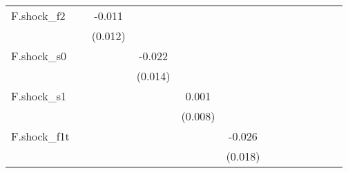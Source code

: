 {\begin{tabular}{l*{12}{c}}
\addlinespace
F.shock\_f2  &                     &      -0.011         &                     &                     &                     &                     &                     &                     &                     &                     &                     &                     \\
            &                     &     (0.012)         &                     &                     &                     &                     &                     &                     &                     &                     &                     &                     \\
\addlinespace
F.shock\_s0  &                     &                     &      -0.022         &                     &                     &                     &                     &                     &                     &                     &                     &                     \\
            &                     &                     &     (0.014)         &                     &                     &                     &                     &                     &                     &                     &                     &                     \\
\addlinespace
F.shock\_s1  &                     &                     &                     &       0.001         &                     &                     &                     &                     &                     &                     &                     &                     \\
            &                     &                     &                     &     (0.008)         &                     &                     &                     &                     &                     &                     &                     &                     \\
\addlinespace
F.shock\_f1t &                     &                     &                     &                     &      -0.026         &                     &                     &                     &                     &                     &                     &                     \\
            &                     &                     &                     &                     &     (0.018)         &                     &                     &                     &                     &                     &                     &                     \\

\end{tabular}}
